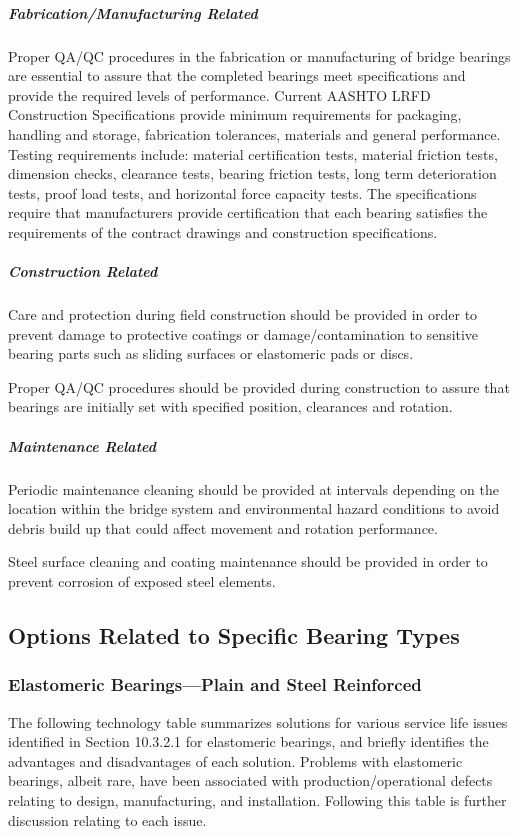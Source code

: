 \subparagraph{Fabrication/Manufacturing Related}
\label{subpar:fabrication-related}
Proper QA/QC procedures in the fabrication or manufacturing of bridge bearings are essential to assure that the
completed bearings meet specifications and provide the required levels of performance. Current AASHTO LRFD Construction Specifications provide minimum requirements for packaging, handling and storage, fabrication
tolerances, materials and general performance. Testing requirements include: material certification tests, material
friction tests, dimension checks, clearance tests, bearing friction tests, long term deterioration tests, proof load tests,
and horizontal force capacity tests. The specifications require that manufacturers provide certification that each
bearing satisfies the requirements of the contract drawings and construction specifications.

\subparagraph{Construction Related}
Care and protection during field construction should be provided in order to prevent damage to protective
coatings or damage/contamination to sensitive bearing parts such as sliding surfaces or elastomeric pads or discs.

Proper QA/QC procedures should be provided during construction to assure that bearings are initially set with
specified position, clearances and rotation.

\subparagraph{Maintenance Related}
Periodic maintenance cleaning should be provided at intervals depending on the location within the bridge
system and environmental hazard conditions to avoid debris build up that could affect movement and rotation
performance.

Steel surface cleaning and coating maintenance should be provided in order to prevent corrosion of exposed steel
elements.


\subsection{Options Related to Specific Bearing Types}

\subsubsection{Elastomeric Bearings—Plain and Steel Reinforced}
The following technology table summarizes solutions for various service life issues identified in Section 10.3.2.1
for elastomeric bearings, and briefly identifies the advantages and disadvantages of each solution. Problems with
elastomeric bearings, albeit rare, have been associated with production/operational defects relating to design,
manufacturing, and installation. Following this table is further discussion relating to each issue.

